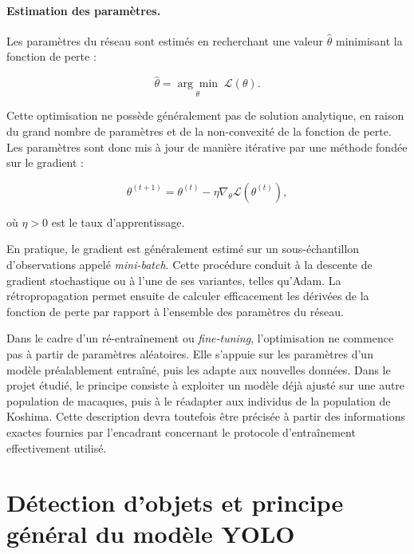 \documentclass[11pt,a4paper]{report}
\begin{document}
\paragraph{Estimation des paramètres.}

Les paramètres du réseau sont estimés en recherchant une valeur
$\widehat{\theta}$ minimisant la fonction de perte :

\begin{equation}
    \widehat{\theta}
    =
    \underset{\theta}{\arg\min}
    \;
    \mathcal{L}(\theta).
\end{equation}

Cette optimisation ne possède généralement pas de solution analytique, en
raison du grand nombre de paramètres et de la non-convexité de la fonction de
perte. Les paramètres sont donc mis à jour de manière itérative par une méthode
fondée sur le gradient :

\begin{equation}
    \theta^{(t+1)}
    =
    \theta^{(t)}
    -
    \eta
    \nabla_{\theta}
    \mathcal{L}
    \left(
        \theta^{(t)}
    \right),
    \label{eq:gradient}
\end{equation}

où $\eta>0$ est le taux d'apprentissage.

En pratique, le gradient est généralement estimé sur un sous-échantillon
d'observations appelé \emph{mini-batch}. Cette procédure conduit à la descente
de gradient stochastique ou à l'une de ses variantes, telles qu'Adam. La
rétropropagation permet ensuite de calculer efficacement les dérivées de la
fonction de perte par rapport à l'ensemble des paramètres du réseau.

Dans le cadre d'un ré-entraînement ou \emph{fine-tuning}, l'optimisation ne
commence pas à partir de paramètres aléatoires. Elle s'appuie sur les paramètres
d'un modèle préalablement entraîné, puis les adapte aux nouvelles données. Dans
le projet étudié, le principe consiste à exploiter un modèle déjà ajusté sur
une autre population de macaques, puis à le réadapter aux individus de la
population de Koshima. Cette description devra toutefois être précisée à partir
des informations exactes fournies par l'encadrant concernant le protocole
d'entraînement effectivement utilisé.

\section{Détection d'objets et principe général du modèle YOLO}
\end{document}
